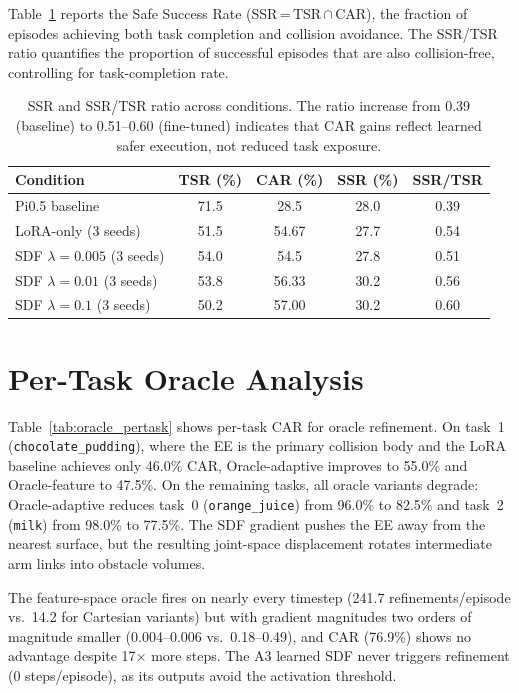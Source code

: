 Table~\ref{tab:ssr} reports the Safe Success Rate (SSR\,=\,TSR\,$\cap$\,CAR), the fraction of episodes achieving both task completion and collision avoidance. The SSR/TSR ratio quantifies the proportion of successful episodes that are also collision-free, controlling for task-completion rate.

\begin{table}[h]
\centering
\caption{SSR and SSR/TSR ratio across conditions. The ratio increase from 0.39 (baseline) to 0.51--0.60 (fine-tuned) indicates that CAR gains reflect learned safer execution, not reduced task exposure.}
\label{tab:ssr}
\vspace{2pt}
\small
\begin{tabular}{lcccc}
\toprule
Condition & TSR (\%) & CAR (\%) & SSR (\%) & SSR/TSR \\
\midrule
Pi0.5 baseline & 71.5 & 28.5 & 28.0 & 0.39 \\
LoRA-only (3 seeds) & 51.5 & 54.67 & 27.7 & 0.54 \\
SDF $\lambda{=}0.005$ (3 seeds) & 54.0 & 54.5 & 27.8 & 0.51 \\
SDF $\lambda{=}0.01$ (3 seeds) & 53.8 & 56.33 & 30.2 & 0.56 \\
SDF $\lambda{=}0.1$ (3 seeds) & 50.2 & 57.00 & 30.2 & 0.60 \\
\bottomrule
\end{tabular}
\end{table}

\section{Per-Task Oracle Analysis}
\label{sec:appendix_pertask}
\label{sec:appendix_pertask_oracle}

Table~\ref{tab:oracle_pertask} shows per-task CAR for oracle refinement. On task~1 (\texttt{chocolate\_pudding}), where the EE is the primary collision body and the LoRA baseline achieves only 46.0\% CAR, Oracle-adaptive improves to 55.0\% and Oracle-feature to 47.5\%. On the remaining tasks, all oracle variants degrade: Oracle-adaptive reduces task~0 (\texttt{orange\_juice}) from 96.0\% to 82.5\% and task~2 (\texttt{milk}) from 98.0\% to 77.5\%. The SDF gradient pushes the EE away from the nearest surface, but the resulting joint-space displacement rotates intermediate arm links into obstacle volumes.

The feature-space oracle fires on nearly every timestep (241.7 refinements/episode vs.\ 14.2 for Cartesian variants) but with gradient magnitudes two orders of magnitude smaller (0.004--0.006 vs.\ 0.18--0.49), and CAR (76.9\%) shows no advantage despite 17$\times$ more steps. The A3 learned SDF never triggers refinement (0 steps/episode), as its outputs avoid the activation threshold.

